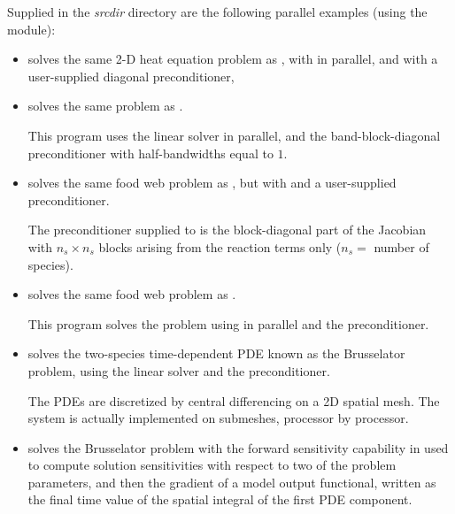 
\vspace{0.2in}\noindent 
Supplied in the {\em srcdir} directory are
the following parallel examples (using the {\nvecp} module):

\begin{itemize}


\item {}
  solves the same 2-D heat equation problem as , with {\idaspgmr}
  in parallel, and with a user-supplied diagonal preconditioner,
  
\item {}
  solves the same problem as .

  This program uses the {\idaspgmr} linear solver in parallel,
  and the band-block-diagonal preconditioner {\idabbdpre} with half-bandwidths 
  equal to $1$.

\item {}
  solves the same food web problem as , but with {\idaspgmr}
  and a user-supplied preconditioner.
  
  The preconditioner supplied to {\idaspgmr} is the block-diagonal part of 
  the Jacobian with $n_s \times n_s$ blocks arising from the reaction terms only
  ($n_s =$ number of species).

\item {}
  solves the same food web problem as .

  This program solves the problem using {\idaspgmr} in parallel and the
  {\idabbdpre} preconditioner.

\item {}
  solves the two-species time-dependent PDE known as the Brusselator problem,
  using the {\idaspgmr} linear solver and the {\idabbdpre} preconditioner.

  The PDEs are discretized by central differencing on a 2D spatial mesh.
  The system is actually implemented on submeshes, processor by processor.


\item {}
  solves the Brusselator problem with the forward sensitivity capability in {\idas}
  used to compute solution sensitivities with respect to two of the problem 
  parameters, and then the gradient of a model output functional, written as
  the final time value of the spatial integral of the first PDE component.


\end{itemize}
